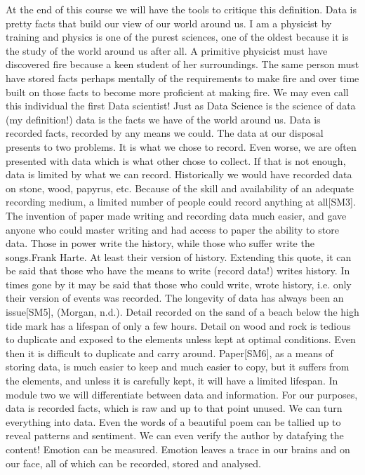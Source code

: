 \documentclass{book}
\begin{document}
At the end of this course we will have the tools to critique this definition. Data is pretty facts that build our view of our world around us.  I am a physicist by training and physics is one of the purest sciences, one of the oldest because it is the study of the world around us after all.  A primitive physicist must have discovered fire because a keen student of her surroundings.  The same person must have stored facts perhaps mentally of the requirements to make fire and over time built on those facts to become more proficient at making fire.  We may even call this individual the first Data scientist!  Just as Data Science is the science of data (my definition!) data is the facts we have of the world around us.  Data is recorded facts, recorded by any means we could.  The data at our disposal presents to two problems.  It is what we chose to record.  Even worse, we are often presented with data which is what other chose to collect.  If that is not enough, data is limited by what we can record.  Historically we would have recorded data on stone, wood, papyrus, etc.  Because of the skill and availability of an adequate recording medium, a limited number of people could record anything at all[SM3].  The invention of paper made writing and recording data much easier, and gave anyone who could master writing and had access to paper the ability to store data.  Those in power write the history, while those who suffer write the songs.Frank Harte.  At least their version of history.  Extending this quote, it can be said that those who have the means to write (record data!) writes history.  In times gone by it may be said that those who could write, wrote history, i.e. only their version of events was recorded. 
The longevity of data has always been an issue[SM5], (Morgan, n.d.).  Detail recorded on the sand of a beach below the high tide mark has a lifespan of only a few hours.  Detail on wood and rock is tedious to duplicate and exposed to the elements unless kept at optimal conditions.  Even then it is difficult to duplicate and carry around.  Paper[SM6], as a means of storing data, is much easier to keep and much easier to copy, but it suffers from the elements, and unless it is carefully kept, it will have a limited lifespan.  In module two we will differentiate between data and information. For our purposes, data is recorded facts, which is raw and up to that point unused.
We can turn everything into data.  Even the words of a beautiful poem can be tallied up to reveal patterns and sentiment.  We can even verify the author by datafying the content!  Emotion can be measured.  Emotion leaves a trace in our brains and on our face, all of which can be recorded, stored and analysed.
\end{document}
